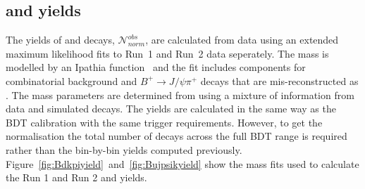 {{%



\subsection{\bdkpi and \bujpsik yields}
The yields of \bujpsik and \bdkpi decays, $ \mathcal{N}^{obs}_{norm}$, are calculated from data using an extended maximum likelihood fits to Run~1 and Run~2 data seperately. 
The \bujpsik mass \pdf is modelled by an Ipathia function~\cite{} and the fit includes components for combinatorial background and $B^{+} \to J/\psi \pi^{+}$ decays that are mis-reconstructed as \bujpsik. The mass \pdf parameters are determined from using a mixture of information from data and simulated decays. The \bdkpi yields are calculated in the same way as the BDT calibration with the same trigger requirements. However, to get the normalisation the total number of \bdkpi decays across the full BDT range is required rather than the bin-by-bin yields computed previously. Figure~\ref{fig:Bdkpiyield}~and~\ref{fig:Bujpsikyield} show the mass fits used to calculate the Run 1 and Run 2 \bdkpi and \bujpsik yields.


}}
